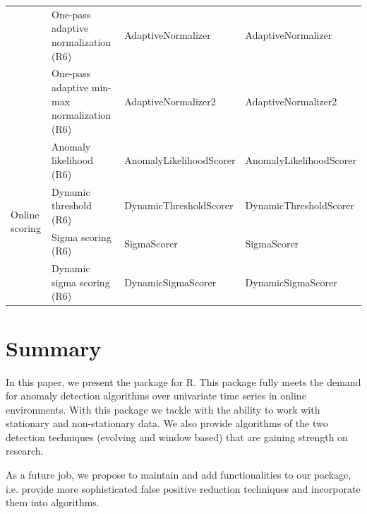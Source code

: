 \documentclass[a4paper]{article}\usepackage[]{graphicx}\usepackage[]{color}
\begin{document}
\begin{table}[htbp]
{\begin{tabular}{llll}
     & One-pass adaptive normalization (R6) & AdaptiveNormalizer & AdaptiveNormalizer \\
     & One-pass adaptive min-max normalization (R6) & AdaptiveNormalizer2 & AdaptiveNormalizer2 \\ \hline
     \multirow{4}{*}{Online scoring}
     & Anomaly likelihood (R6) & AnomalyLikelihoodScorer & AnomalyLikelihoodScorer \\
     & Dynamic threshold (R6) & DynamicThresholdScorer & DynamicThresholdScorer \\
     & Sigma scoring (R6) & SigmaScorer & SigmaScorer \\
     & Dynamic sigma scoring (R6) & DynamicSigmaScorer & DynamicSigmaScorer \\ \hline
  \end{tabular}%
  }
\end{table}

\section{Summary}\label{sec:summary}

In this paper, we present the  package for R. This package fully meets the demand for anomaly detection algorithms over univariate time series in online environments. With this package we tackle with the ability to work with stationary and non-stationary data. We also provide algorithms of the two detection techniques (evolving and window based) that are gaining strength on research.

As a future job, we propose to maintain and add functionalities to our  package, i.e. provide more sophisticated false positive reduction techniques and incorporate them into algorithms.



\end{document}
